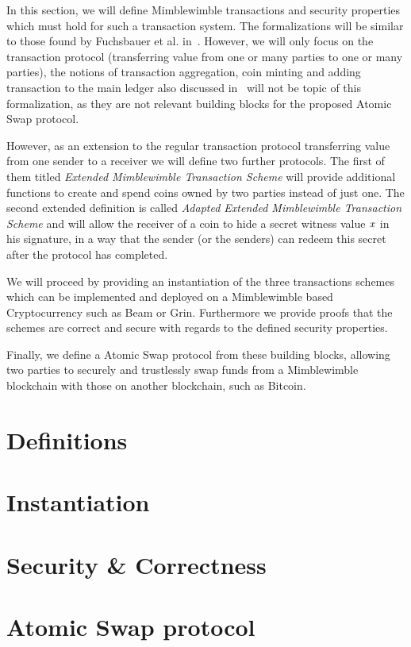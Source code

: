 In this section, we will define Mimblewimble transactions and security properties which must hold for such a transaction system. The formalizations will be similar to those found by Fuchsbauer et al. in~\cite{fuchsbauer2019aggregate}.
However, we will only focus on the transaction protocol (transferring value from one or many parties to one or many parties), the notions of transaction aggregation, coin minting and adding transaction to the main ledger also discussed in~\cite{fuchsbauer2019aggregate} will not be topic of this formalization, as
they are not relevant building blocks for the proposed Atomic Swap protocol.

However, as an extension to the regular transaction protocol transferring value from one sender to a receiver we will define two further protocols. The first of them titled \emph{Extended Mimblewimble Transaction Scheme}
will provide additional functions to create and spend coins owned by two parties instead of just one. The second extended definition is called \emph{Adapted Extended Mimblewimble Transaction Scheme} and will allow the receiver
of a coin to hide a secret witness value $\mathit{x}$ in his signature, in a way that the sender (or the senders) can redeem this secret after the protocol has completed.

We will proceed by providing an instantiation of the three transactions schemes which can be implemented and deployed on a Mimblewimble based Cryptocurrency such as Beam or Grin. Furthermore we provide proofs
that the schemes are correct and secure with regards to the defined security properties.

Finally, we define a Atomic Swap protocol from these building blocks, allowing two parties to securely and trustlessly swap funds from a Mimblewimble blockchain with those on another blockchain, such as Bitcoin.

\section{Definitions}\label{sec:atom:definitions}


\section{Instantiation}\label{sec:atom:atomic-inst}


\section{Security \& Correctness} \label{sec:atom:security}


\section{Atomic Swap protocol}\label{sec:atom:atomic-swap}
